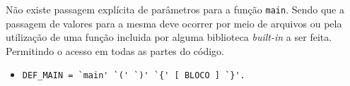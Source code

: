 \begin{itemize}
            Não existe
            passagem explícita de parâmetros para a função \verb!main!. Sendo
            que a passagem de valores para a mesma deve ocorrer por meio de
            arquivos ou pela utilização de uma função incluida por alguma
            biblioteca \emph{built-in} a ser feita. Permitindo o acesso em 
            todas as partes do código. 
        \begin{itemize}
            \item \verb$DEF_MAIN = `main' `(' `)' `{' [ BLOCO ] `}'.$
        \end{itemize}
\end{itemize}
